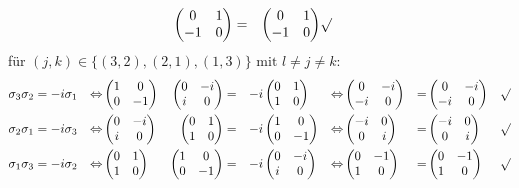 \documentclass{HM}
\begin{document}
\begin{enumerate}
\begin{align*}
\begin{pmatrix}
0&1\\
-1&0
\end{pmatrix}&=&\begin{pmatrix}
0&1\\
-1&0
\end{pmatrix} &\surd
\end{align*}
für $(j,k)\in\lbrace(3,2),(2,1),(1,3)\rbrace \text{ mit } l\neq j\neq k$:
\begin{align*}
\sigma_3\sigma_2&=-i\sigma_1 &\Leftrightarrow& \begin{pmatrix}
1&0\\
0&-1
\end{pmatrix}&\begin{pmatrix}
0&-i\\
i&0
\end{pmatrix}&=&-i&\begin{pmatrix}
0&1\\
1&0
\end{pmatrix}&\Leftrightarrow& \begin{pmatrix}
0&-i\\
-i&0
\end{pmatrix}&=&\begin{pmatrix}
0&-i\\
-i&0
\end{pmatrix} &\surd\\
\sigma_2\sigma_1&=-i\sigma_3 &\Leftrightarrow& \begin{pmatrix}
0&-i\\
i&0
\end{pmatrix}&\begin{pmatrix}
0&1\\
1&0
\end{pmatrix}&=&-i&\begin{pmatrix}
1&0\\
0&-1
\end{pmatrix}&\Leftrightarrow& \begin{pmatrix}
-i&0\\
0&i
\end{pmatrix}&=&\begin{pmatrix}
-i&0\\
0&i
\end{pmatrix} &\surd\\
\sigma_1\sigma_3&=-i\sigma_2 &\Leftrightarrow& \begin{pmatrix}
0&1\\
1&0
\end{pmatrix}&\begin{pmatrix}
1&0\\
0&-1
\end{pmatrix}&=&-i&\begin{pmatrix}
0&-i\\
i&0
\end{pmatrix}&\Leftrightarrow& \begin{pmatrix}
0&-1\\
1&0
\end{pmatrix}&=&\begin{pmatrix}
0&-1\\
1&0
\end{pmatrix} &\surd
\end{align*}
\end{enumerate}
\end{document}
